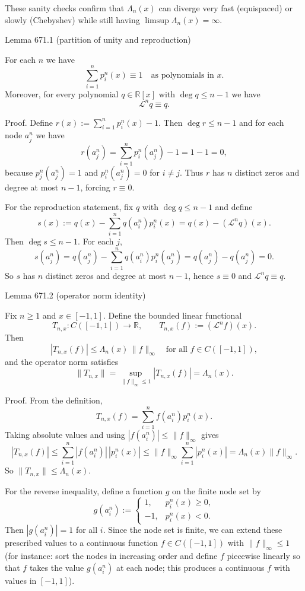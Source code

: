 These sanity checks confirm that $\Lambda_n(x)$ can diverge very fast (equispaced) or slowly (Chebyshev) while still having $\limsup\Lambda_n(x)=\infty$.

Lemma 671.1 (partition of unity and reproduction)

For each $n$ we have
\[
 \sum_{i=1}^n p_i^n(x)\equiv 1\quad\text{as polynomials in }x.
\]
Moreover, for every polynomial $q\in\mathbb R[x]$ with $\deg q\le n-1$ we have
\[
 \mathcal L^n q\equiv q.
\]

Proof.
Define $r(x):=\sum_{i=1}^n p_i^n(x)-1$. Then $\deg r\le n-1$ and for each node $a_j^n$ we have
\[
 r(a_j^n)=\sum_{i=1}^n p_i^n(a_j^n)-1 = 1-1=0,
\]
because $p_j^n(a_j^n)=1$ and $p_i^n(a_j^n)=0$ for $i\ne j$. Thus $r$ has $n$ distinct zeros and degree at most $n-1$, forcing $r\equiv 0$.

For the reproduction statement, fix $q$ with $\deg q\le n-1$ and define
\[
 s(x):=q(x)-\sum_{i=1}^n q(a_i^n)p_i^n(x)=q(x)-(\mathcal L^n q)(x).
\]
Then $\deg s\le n-1$. For each $j$,
\[
 s(a_j^n)=q(a_j^n)-\sum_{i=1}^n q(a_i^n)p_i^n(a_j^n)=q(a_j^n)-q(a_j^n)=0.
\]
So $s$ has $n$ distinct zeros and degree at most $n-1$, hence $s\equiv 0$ and $\mathcal L^n q\equiv q$.


Lemma 671.2 (operator norm identity)

Fix $n\ge 1$ and $x\in[-1,1]$. Define the bounded linear functional
\[
T_{n,x}:C([-1,1])\to\mathbb R,\qquad T_{n,x}(f):=(\mathcal L^n f)(x).
\]
Then
\[
 |T_{n,x}(f)|\le \Lambda_n(x)\,\|f\|_\infty\quad\text{for all }f\in C([-1,1]),
\]
and the operator norm satisfies
\[
 \|T_{n,x}\|=\sup_{\|f\|_\infty\le 1}|T_{n,x}(f)|=\Lambda_n(x).
\]

Proof.
From the definition,
\[
T_{n,x}(f)=\sum_{i=1}^n f(a_i^n)p_i^n(x).
\]
Taking absolute values and using $|f(a_i^n)|\le\|f\|_\infty$ gives
\[
|T_{n,x}(f)|\le \sum_{i=1}^n |f(a_i^n)|\,|p_i^n(x)|\le \|f\|_\infty\sum_{i=1}^n |p_i^n(x)|=\Lambda_n(x)\|f\|_\infty.
\]
So $\|T_{n,x}\|\le\Lambda_n(x)$.

For the reverse inequality, define a function $g$ on the finite node set by
\[
 g(a_i^n):=\begin{cases}
 1,& p_i^n(x)\ge 0,\\
 -1,& p_i^n(x)<0.
\end{cases}
\]
Then $|g(a_i^n)|=1$ for all $i$. Since the node set is finite, we can extend these prescribed values to a continuous function $f\in C([-1,1])$ with $\|f\|_\infty\le 1$ (for instance: sort the nodes in increasing order and define $f$ piecewise linearly so that $f$ takes the value $g(a_i^n)$ at each node; this produces a continuous $f$ with values in $[-1,1]$).

